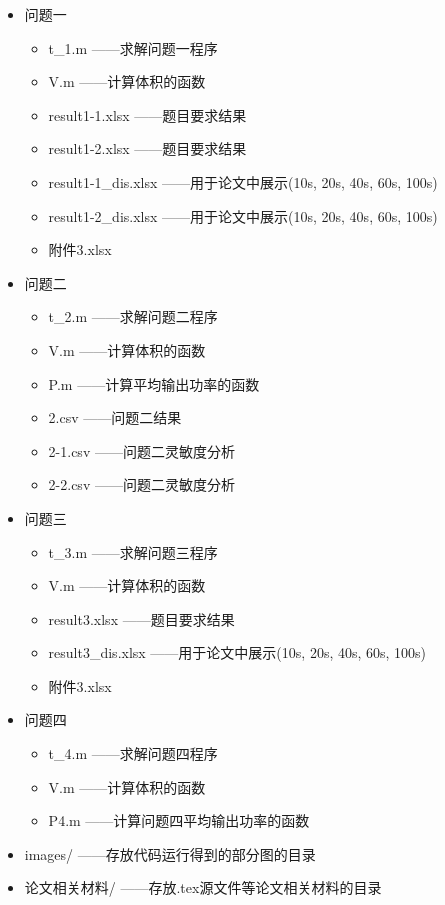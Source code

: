 \documentclass{my_paper}
\begin{document}
\begin{itemize}
\item 问题一
\begin{itemize}
    \item t\_1.m \quad ——求解问题一程序
    \item V.m \quad ——计算体积的函数
    \item result1-1.xlsx \quad ——题目要求结果
    \item result1-2.xlsx \quad ——题目要求结果
    \item result1-1\_dis.xlsx \quad ——用于论文中展示(10s, 20s, 40s, 60s, 100s)
    \item result1-2\_dis.xlsx \quad ——用于论文中展示(10s, 20s, 40s, 60s, 100s)
    \item 附件3.xlsx
\end{itemize}
    
\item 问题二
\begin{itemize}
    \item t\_2.m \quad ——求解问题二程序
    \item V.m \quad ——计算体积的函数
    \item P.m \quad ——计算平均输出功率的函数
    \item 2.csv \quad ——问题二结果
    \item 2-1.csv \quad ——问题二灵敏度分析
    \item 2-2.csv \quad ——问题二灵敏度分析
\end{itemize}

\item 问题三
\begin{itemize}
    \item t\_3.m \quad ——求解问题三程序
    \item V.m \quad ——计算体积的函数
    \item result3.xlsx \quad ——题目要求结果
    \item result3\_dis.xlsx \quad ——用于论文中展示(10s, 20s, 40s, 60s, 100s)
    \item 附件3.xlsx
\end{itemize}

\newpage
\item 问题四
\begin{itemize}
    \item t\_4.m \quad ——求解问题四程序
    \item V.m \quad ——计算体积的函数
    \item P4.m ——计算问题四平均输出功率的函数
\end{itemize}

\item images/ \quad ——存放代码运行得到的部分图的目录
\item 论文相关材料/ \quad ——存放.tex源文件等论文相关材料的目录


\end{itemize}
\end{document}
